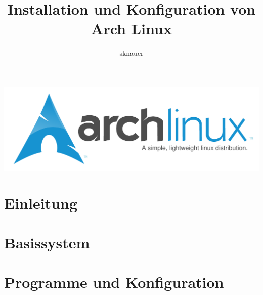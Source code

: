 \documentclass[11pt]{scrartcl}
\author{sknauer}
\title{Installation und Konfiguration von Arch Linux}
\begin{document}
\maketitle
\includegraphics[scale=0.75]{arch-logo.pdf}

\section{Einleitung}
\label{sec:einleitung}


\section{Basissystem}
\label{sec:base-system}

    
\section{Programme und Konfiguration}
\label{sec:programme}

\end{document}
